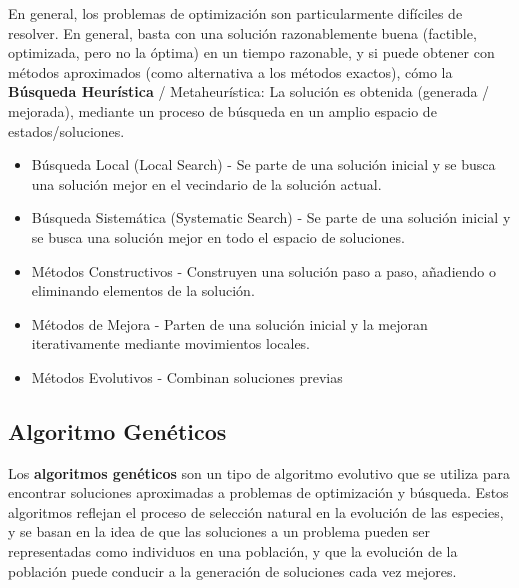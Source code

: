 
En general, los problemas de optimización son particularmente difíciles de resolver.
En general, basta con una solución razonablemente buena (factible, optimizada, pero no la
óptima) en un tiempo razonable, y si puede obtener con métodos aproximados (como alternativa a los métodos exactos), cómo la \textbf{Búsqueda Heurística} / Metaheurística: La solución es obtenida (generada / mejorada), mediante un proceso de búsqueda en un amplio espacio de estados/soluciones.

\begin{itemize}
   \item Búsqueda Local (Local Search) - Se parte de una solución inicial y se busca una solución mejor en el vecindario de la solución actual.
   \item Búsqueda Sistemática (Systematic Search) - Se parte de una solución inicial y se busca una solución mejor en todo el espacio de soluciones.
\end{itemize}

\begin{itemize}
   \item Métodos Constructivos - Construyen una solución paso a paso, añadiendo o eliminando elementos de la solución.
   \item Métodos de Mejora - Parten de una solución inicial y la mejoran iterativamente mediante movimientos locales.
   \item Métodos Evolutivos - Combinan soluciones previas
\end{itemize}


\subsection{Algoritmo Genéticos}
Los \textbf{algoritmos genéticos} son un tipo de algoritmo evolutivo que se utiliza para encontrar soluciones aproximadas a problemas de optimización y búsqueda. Estos algoritmos reflejan el proceso de selección natural en la evolución de las especies, y se basan en la idea de que las soluciones a un problema pueden ser representadas como individuos en una población, y que la evolución de la población puede conducir a la generación de soluciones cada vez mejores.


